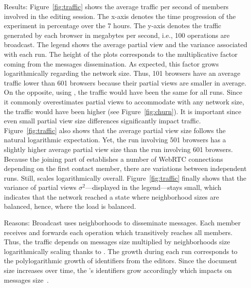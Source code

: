 \begin{asparadesc}
\item [Results:] Figure~\ref{fig:traffic} shows the average traffic
  per second of members involved in the editing session. The x-axis
  denotes the time progression of the experiment in percentage over
  the 7 hours. The y-axis denotes the traffic generated by each
  browser in megabytes per second, i.e., 100 operations are
  broadcast. The legend shows the average partial view and the
  variance associated with each run. The height of the plots
  corresponds to the multiplicative factor coming from the messages
  dissemination. As expected, this factor grows logarithmically
  regarding the network size. Thus, 101 browsers have an average
  traffic lower than 601 browsers because their partial views are
  smaller in average.  On the opposite, using \CYCLON, the traffic
  would have been the same for all runs. Since it commonly
  overestimates partial views to accommodate with any network size,
  the traffic would have been higher (see Figure~\ref{fig:churn}). It
  is important since even small partial view size differences
  significantly impact traffic.  Figure~\ref{fig:traffic} also shows
  that the average partial view size follows the natural logarithmic
  expectation. Yet, the run involving 501 browsers has a slightly
  higher average partial view size than the run involving 601
  browsers. Because the joining part of \SPRAY establishes a number of
  WebRTC connections depending on the first contact member, there are
  variations between independent runs. Still, \SPRAY scales
  logarithmically overall. Figure~\ref{fig:traffic} finally shows that
  the variance of partial views $\sigma^2$---displayed in the
  legend---stays small, which indicates that the network reached a
  state where neighborhood sizes are balanced, hence, where the load is
  balanced.
\item [Reasons:] Broadcast uses neighborhoods to disseminate messages. Each
  member receives and forwards each operation which transitively reaches all
  members. Thus, the traffic depends on messages size multiplied by
  neighborhoods size logarithmically scaling thanks to \SPRAY. The growth during
  each run corresponds to the polylogarithmic growth of identifiers from the
  editors. Since the document size increases over time, the \LSEQ's identifiers
  grow accordingly which impacts on messages size~\cite{nedelec2013lseq}.
\end{asparadesc}



